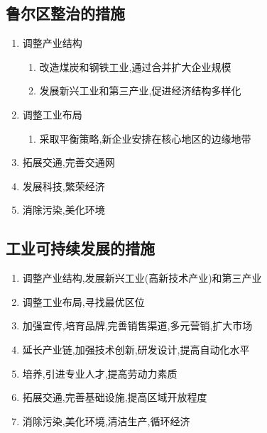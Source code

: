 \documentclass[a4paper]{article}
\begin{document}
    \subsection{鲁尔区整治的措施}
    \begin{enumerate}
        \item 调整产业结构
        \begin{enumerate}
            \item 改造煤炭和钢铁工业,通过合并扩大企业规模
            \item 发展新兴工业和第三产业,促进经济结构多样化
        \end{enumerate}
        \item 调整工业布局
        \begin{enumerate}
            \item 采取平衡策略,新企业安排在核心地区的边缘地带
        \end{enumerate}
        \item 拓展交通,完善交通网
        \item 发展科技,繁荣经济
        \item 消除污染,美化环境
    \end{enumerate}
    \subsection{工业可持续发展的措施}
    \begin{enumerate}
        \item 调整产业结构,发展新兴工业(高新技术产业)和第三产业
        \item 调整工业布局,寻找最优区位
        \item 加强宣传,培育品牌,完善销售渠道,多元营销,扩大市场
        \item 延长产业链,加强技术创新,研发设计,提高自动化水平
        \item 培养,引进专业人才,提高劳动力素质
        \item 拓展交通,完善基础设施,提高区域开放程度
        \item 消除污染,美化环境,清洁生产,循环经济
    \end{enumerate}
\end{document}
